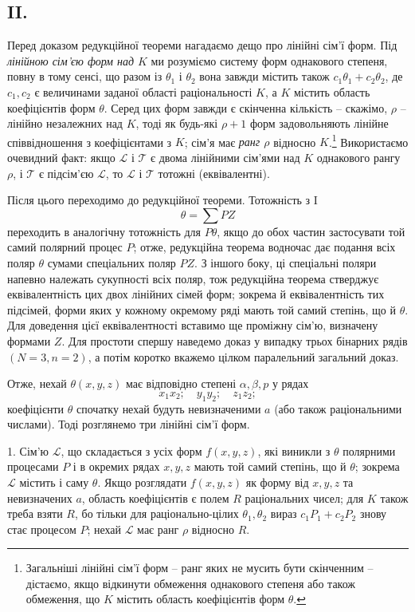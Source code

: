 \documentclass[11pt]{article}
\begin{document}
\subsection*{II.}
Перед доказом редукційної теореми нагадаємо дещо про лінійні сім'ї форм. Під \emph{лінійною сім'єю форм над $K$} ми розуміємо систему форм однакового степеня, повну в тому сенсі, що разом із $\theta_1$ і $\theta_2$ вона завжди містить також $c_1\theta_1+c_2\theta_2$, де $c_1,c_2$ є величинами заданої області раціональності $K$, а $K$ містить область коефіцієнтів форм $\theta$. Серед цих форм завжди є скінченна кількість -- скажімо, $\rho$ -- лінійно незалежних над $K$, тоді як будь-які $\rho+1$ форм задовольняють лінійне співвідношення з коефіцієнтами з $K$; сім'я має \emph{ранг $\rho$} відносно $K$.\footnote{Загальніші лінійні сім'ї форм -- ранг яких не мусить бути скінченним -- дістаємо, якщо відкинути обмеження однакового степеня або також обмеження, що $K$ містить область коефіцієнтів форм $\theta$.} Використаємо очевидний факт: якщо $\mathcal L$ і $\mathcal T$ є двома лінійними сім'ями над $K$ однакового рангу $\rho$, і $\mathcal T$ є підсім'єю $\mathcal L$, то $\mathcal L$ і $\mathcal T$ тотожні (еквівалентні).

Після цього переходимо до редукційної теореми. Тотожність з I
\[
  \theta=\sum PZ
\]
переходить в аналогічну тотожність для $P\theta$, якщо до обох частин застосувати той самий полярний процес $P$; отже, редукційна теорема водночас дає подання всіх поляр $\theta$ сумами спеціальних поляр $PZ$. З іншого боку, ці спеціальні поляри напевно належать сукупності всіх поляр, тож редукційна теорема стверджує еквівалентність цих двох лінійних сімей форм; зокрема й еквівалентність тих підсімей, форми яких у кожному окремому ряді мають той самий степінь, що й $\theta$. Для доведення цієї еквівалентності вставимо ще проміжну сім'ю, визначену формами $Z$. Для простоти спершу наведемо доказ у випадку трьох бінарних рядів $(N=3,n=2)$, а потім коротко вкажемо цілком паралельний загальний доказ.

Отже, нехай $\theta(x,y,z)$ має відповідно степені $\alpha,\beta,p$ у рядах
\[
  x_1x_2;\quad y_1y_2;\quad z_1z_2;
\]
коефіцієнти $\theta$ спочатку нехай будуть невизначеними $a$ (або також раціональними числами). Тоді розглянемо три лінійні сім'ї форм.

1. Сім'ю $\mathcal L$, що складається з усіх форм $f(x,y,z)$, які виникли з $\theta$ полярними процесами $P$ і в окремих рядах $x,y,z$ мають той самий степінь, що й $\theta$; зокрема $\mathcal L$ містить і саму $\theta$. Якщо розглядати $f(x,y,z)$ як форму від $x,y,z$ та невизначених $a$, область коефіцієнтів є полем $R$ раціональних чисел; для $K$ також треба взяти $R$, бо тільки для раціонально-цілих $\theta_1,\theta_2$ вираз $c_1P_1+c_2P_2$ знову стає процесом $P$; нехай $\mathcal L$ має ранг $\rho$ відносно $R$.
\end{document}
